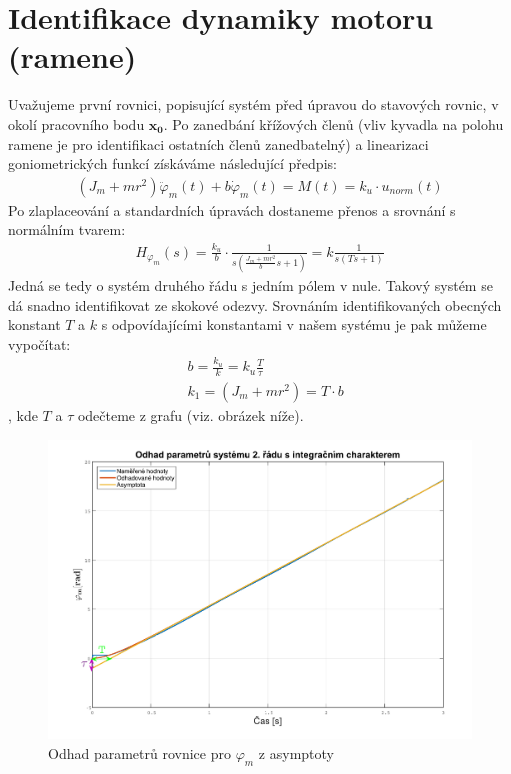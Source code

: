 \documentclass[a4paper,12pt]{article}
\begin{document}
\section{Identifikace dynamiky motoru (ramene)}
Uvažujeme první rovnici, popisující systém před úpravou do stavových rovnic, v okolí pracovního bodu $\mathbf{x_0}$. Po zanedbání křížových členů (vliv kyvadla na polohu ramene je pro identifikaci ostatních členů zanedbatelný) a linearizaci goniometrických funkcí získáváme následující předpis:
\begin{align*}
(J_m + mr^2)\ddot{\varphi}_m(t) + b\dot{\varphi}_m(t) = M(t) = k_u\cdot u_{norm}(t)
\end{align*}
Po zlaplaceování a standardních úpravách dostaneme přenos a srovnání s normálním tvarem:
\begin{align*}
H_{\varphi_m}(s) = \frac{k_u}{b}\cdot \frac{1}{s(\frac{J_m + mr^2}{b}s + 1)} = k\frac{1}{s(Ts + 1)}
\end{align*}
Jedná se tedy o systém druhého řádu s jedním pólem v nule. Takový systém se dá snadno identifikovat ze skokové odezvy. Srovnáním identifikovaných obecných konstant $T$ a $k$ s odpovídajícími konstantami v našem systému je pak můžeme vypočítat:
\begin{align*}
&b = \frac{k_u}{k} = k_u\frac{T}{\tau}	\\
&k_1 = (J_m + mr^2) = T\cdot b
\end{align*}
, kde $T$ a $\tau$ odečteme z grafu (viz. obrázek níže).
\begin{figure}[H]
	\centering
    \includegraphics[scale=.4]{Odhad_phim}
    \caption{Odhad parametrů rovnice pro $\varphi_m$ z asymptoty}
\end{figure}
\end{document}
